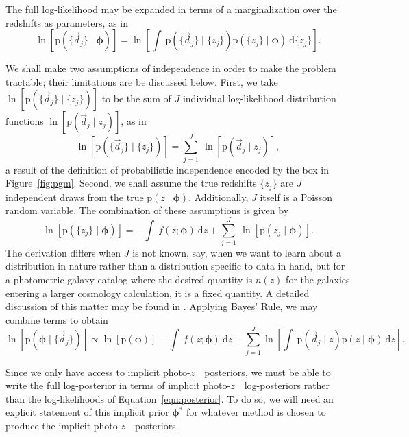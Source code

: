\documentclass[iop]{emulateapj}
\newcommand{\Eq}[1]{Equation~\ref{#1}}
\newcommand{\Fig}[1]{Figure~\ref{#1}}
\newcommand{\data}{\ensuremath{\vec{d}}}
\newcommand{\pr}[1]{\ensuremath{\mathrm{p}(#1)}}
\newcommand{\gvn}{\mid}%
\newcommand{\integral}[2]{\ensuremath{\int\ #1\ \mathrm{d} #2}}
\newcommand{\pz}{photo-$z$~}
\newcommand{\bvec}[1]{{\ensuremath{\boldsymbol{#1}}}}
\newcommand{\ndphi}{\bvec{\phi}}
\begin{document}
The full log-likelihood may be expanded in terms of a marginalization over the 
redshifts as parameters, as in 
\begin{equation}
\label{eqn:marginalize}
\ln[\pr{\{\data_{j}\} \gvn \ndphi}] = \ln\left[\integral{\pr{\{\data_{j}\} \gvn 
\{z_{j}\}} \pr{\{z_{j}\} \gvn \ndphi}}{\{z_{j}\}}\right].
\end{equation}

We shall make two assumptions of independence in order to make the problem 
tractable; their limitations are be discussed below.  
First, we take $\ln[\pr{\{\data_{j}\} \gvn \{z_{j}\}}]$ to be the sum of $J$ 
individual log-likelihood distribution functions $\ln[\pr{\data_{j} \gvn 
z_{j}}]$, as in 
\begin{equation}
\label{eqn:indiedat}
\ln[\pr{\{\data_{j}\} \gvn \{z_{j}\}}] = \sum_{j=1}^{J}\ \ln[\pr{\data_{j} \gvn 
z_{j}}],
\end{equation}
a result of the definition of probabilistic independence encoded by the box in 
\Fig{fig:pgm}.
Second, we shall assume the true redshifts $\{z_{j}\}$ are $J$ independent 
draws from the true $\pr{z \gvn \ndphi}$.  
Additionally, $J$ itself is a Poisson random variable.  
The combination of these assumptions is given by 
\begin{equation}
\label{eqn:indie}
\ln[\pr{\{z_{j}\} \gvn \ndphi}] = -\integral{f(z; \ndphi)}{z} + \sum_{j=1}^{J}\ 
\ln[\pr{z_{j} \gvn \ndphi}].
\end{equation}
The derivation differs when $J$ is not known, say, when we want to learn about 
a distribution in nature rather than a distribution specific to data in hand, 
but for a photometric galaxy catalog where the desired quantity is $n(z)$ for 
the galaxies entering a larger cosmology calculation, it is a fixed quantity.
A detailed discussion of this matter may be found in 
\citet{Foreman-Mackey2014}.  
Applying Bayes' Rule, we may combine terms to obtain 
\begin{equation}
\label{eqn:posterior}
\ln[\pr{\ndphi \gvn \{\data_{j}\}}] \propto \ln[\pr{\ndphi}] - \integral{f(z; 
\ndphi)}{z} + \sum_{j=1}^{J}\ln\left[\integral{\pr{\data_{j} \gvn z} \pr{z \gvn 
\ndphi}}{z}\right].
\end{equation}


Since we only have access to implicit \pz\ posteriors, we must be able to write 
the full log-posterior in terms of implicit \pz\ log-posteriors rather than the 
log-likelihoods of \Eq{eqn:posterior}.
To do so, we will need an explicit statement of this implicit prior 
$\ndphi^{*}$ for whatever method is chosen to produce the implicit \pz\ 
posteriors.  
\end{document}
